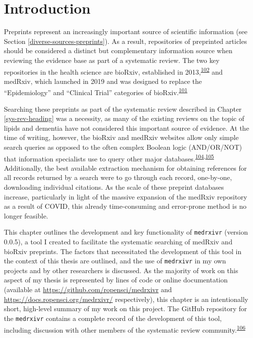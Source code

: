 \documentclass[a4paper, twoside]{templates/ociamthesis}
\begin{document}
\hypertarget{sys-rev-tools-intro}{%
\section{Introduction}\label{sys-rev-tools-intro}}

Preprints represent an increasingly important source of scientific information (see Section \ref{diverse-sources-preprints}). As a result, repositories of preprinted articles should be considered a distinct but complementary information source when reviewing the evidence base as part of a systematic review. The two key repositories in the health science are bioRxiv, established in 2013,\textsuperscript{\protect\hyperlink{ref-sever2019}{102}} and medRxiv, which launched in 2019 and was designed to replace the ``Epidemiology'' and ``Clinical Trial'' categories of bioRxiv.\textsuperscript{\protect\hyperlink{ref-rawlinson2019}{101}}

Searching these preprints as part of the systematic review described in Chapter \ref{sys-rev-heading} was a necessity, as many of the existing reviews on the topic of lipids and dementia have not considered this important source of evidence. At the time of writing, however, the bioRxiv and medRxiv websites allow only simple search queries as opposed to the often complex Boolean logic (AND/OR/NOT) that information specialists use to query other major databases.\textsuperscript{\protect\hyperlink{ref-bramer2018a}{104},\protect\hyperlink{ref-gusenbauer2020}{105}} Additionally, the best available extraction mechanism for obtaining references for all records returned by a search were to go through each record, one-by-one, downloading individual citations. As the scale of these preprint databases increase, particularly in light of the massive expansion of the medRxiv repository as a result of COVID, this already time-consuming and error-prone method is no longer feasible.

This chapter outlines the development and key functionality of \texttt{medrxivr} (version 0.0.5), a tool I created to facilitate the systematic searching of medRxiv and bioRxiv preprints. The factors that necessitated the development of this tool in the context of this thesis are outlined, and the use of \texttt{medrxivr} in my own projects and by other researchers is discussed. As the majority of work on this aspect of my thesis is represented by lines of code or online documentation (available at \url{https://github.com/ropensci/medrxivr} and \url{https://docs.ropensci.org/medrxivr/} respectively), this chapter is an intentionally short, high-level summary of my work on this project. The GitHub repository for the \texttt{medrxivr} contains a complete record of the development of this tool, including discussion with other members of the systematic review community.\textsuperscript{\protect\hyperlink{ref-zotero-15029}{106}}
\end{document}
